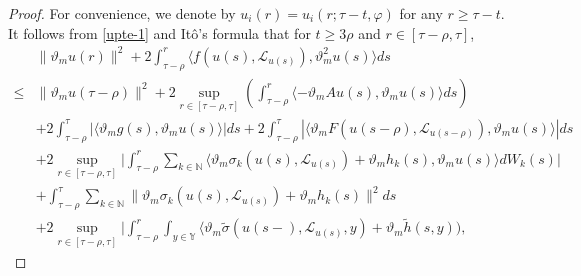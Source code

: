 \documentclass[11pt]{article}
\numberwithin{equation}{section}
\theoremstyle{plain}
\begin{document}
\begin{proof}
 For convenience, we denote by $u_i(r) = u_i(r; \tau-t, \varphi)$ for any $r \ge \tau -t$.
 It follows from \eqref{upte-1} and It\^o's formula that for $t \ge 
 3 \rho$
 and $r\in [\tau -\rho, \tau]$,
   \begin{align}\label{momentpte-1}
        &    \|\vartheta_m u(r)\|^2
                       + 2 \int_{\tau-\rho}^{r}
                              \langle f(u(s),\mathcal{L}_{u(s)} ),
                                     {\vartheta}^2_m u(s)
                              \rangle ds
                \nonumber\\ 
   \le &  \|\vartheta_m u(\tau-\rho)\|^2 
          + 2  \sup_{r \in [\tau-\rho,\tau]}
                     \left (   \int_{\tau-\rho}^{r}
                     \langle -\vartheta_m A u(s), \vartheta_m u(s)
                     \rangle ds
                     \right )
              \nonumber \\  
        & + 2 
                  \int_{\tau-\rho}^{\tau}
                              \left|
                                     \langle \vartheta_m g(s), \vartheta_m u(s)
                                     \rangle
                              \right| ds
         + 2  \int_{\tau-\rho}^{\tau}
                                  \left|
                                         \langle \vartheta_m F(u(s-\rho), \mathcal{L}_{u(s-\rho)}),
                                                 \vartheta_m u(s)
                                         \rangle
                                  \right| ds
                        \nonumber\\
         & + 2   \sup_{r \in [\tau-\rho,\tau]}
                                \Big| \int_{\tau-\rho}^{r} \sum_{k \in \mathbb{N} }
                                      \langle \vartheta_m \sigma_k(u(s), \mathcal{L}_{u(s)}) + \vartheta_m h_k(s),
                                              \vartheta_m u(s)
                                      \rangle dW_k(s)
                                \Big|
             \nonumber\\
        & + \int_{\tau-\rho}^{\tau}
                         \sum_{k \in \mathbb{N} }
                            \|\vartheta_m \sigma_k(u(s), \mathcal{L}_{u(s)})
                               + \vartheta_m h_k(s) \|^2 ds
             \nonumber\\
        & + 2  
        \sup_{r\in [\tau-\rho,\tau]}
                         \Big| \int_{\tau-\rho}^{r}
                                      \int_{y \in \mathbb{Y} }
                                        \langle \vartheta_m \widetilde{\sigma}(u(s-), \mathcal{L}_{u(s)}, y) + \vartheta_m \widetilde{h}(s, y) ),

\end{align}
\end{proof}
\end{document}

